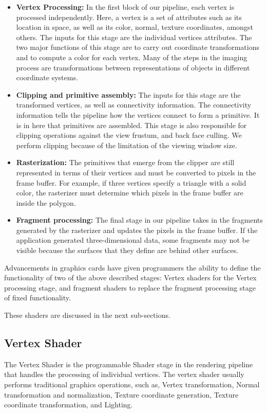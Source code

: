 \begin{itemize}
\item \textbf{Vertex Processing:} In the first block of our pipeline, each vertex is processed independently. Here, a vertex is a set of attributes such as its location in space, as well as its color, normal, texture coordinates, amongst others. The inputs for this stage are the individual vertices attributes. The two major functions of this stage are to carry out coordinate transformations and to compute a color for each vertex. Many of the steps in the imaging process are transformations between representations of objects in different coordinate systems.

\item \textbf{Clipping and primitive assembly:} The inputs for this stage are the transformed vertices, as well as connectivity information. The connectivity information tells the pipeline how the vertices connect to form a primitive. It is in here that primitives are assembled. This stage is also responsible for clipping operations against the view frustum, and back face culling. We perform clipping because of the limitation of the viewing window size.

\item \textbf{Rasterization:} The primitives that emerge from the clipper are still represented in terms of their vertices and must be converted to pixels in the frame buffer. For example, if three vertices specify a triangle with a solid color, the rasterizer must determine which
pixels in the frame buffer are inside the polygon.

\item \textbf{Fragment processing:} The final stage in our pipeline takes in the fragments generated by the rasterizer and updates the pixels in the frame buffer. If the application generated three-dimensional data, some fragments may not be visible because the surfaces that they define are
behind other surfaces.

\end{itemize} 

Advancements in graphics cards have given programmers the ability to define the functionality of two of the above described stages: Vertex shaders for the Vertex processing stage, and fragment shaders to replace the fragment processing stage of fixed functionality.

These shaders are discussed in the next sub-sections. 


\subsection{Vertex Shader}
The Vertex Shader is the programmable Shader stage in the rendering pipeline that handles the processing of individual vertices. The vertex shader usually performs traditional graphics operations, such as, Vertex transformation, Normal transformation and normalization, Texture coordinate generation, Texture coordinate transformation, and Lighting.

